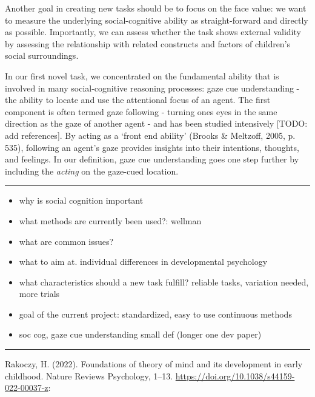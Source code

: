 \documentclass[
  man,floatsintext]{apa6}
\providecommand{\tightlist}{%
  \setlength{\itemsep}{0pt}\setlength{\parskip}{0pt}}
\begin{document}
Another goal in creating new tasks should be to focus on the face value: we want to measure the underlying social-cognitive ability as straight-forward and directly as possible. Importantly, we can assess whether the task shows external validity by assessing the relationship with related constructs and factors of children's social surroundings.

In our first novel task, we concentrated on the fundamental ability that is involved in many social-cognitive reasoning processes: gaze cue understanding - the ability to locate and use the attentional focus of an agent. The first component is often termed gaze following - turning ones eyes in the same direction as the gaze of another agent - and has been studied intensively {[}TODO: add references{]}.
By acting as a `front end ability' (Brooks \& Meltzoff, 2005, p. 535), following an agent's gaze provides insights into their intentions, thoughts, and feelings.
In our definition, gaze cue understanding goes one step further by including the \emph{acting} on the gaze-cued location.

\begin{center}\rule{0.5\linewidth}{0.5pt}\end{center}

\begin{itemize}
\tightlist
\item
  why is social cognition important
\item
  what methods are currently been used?: wellman
\item
  what are common issues?
\item
  what to aim at. individual differences in developmental psychology
\item
  what characteristics should a new task fulfill? reliable tasks, variation needed, more trials
\item
  goal of the current project: standardized, easy to use continuous methods
\item
  soc cog, gaze cue understanding small def (longer one dev paper)
\end{itemize}

\begin{center}\rule{0.5\linewidth}{0.5pt}\end{center}

Rakoczy, H. (2022). Foundations of theory of mind and its development in early childhood. Nature Reviews Psychology, 1--13. \url{https://doi.org/10.1038/s44159-022-00037-z}:
\end{document}
